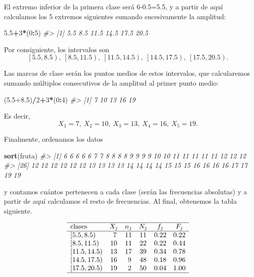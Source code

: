 \documentclass[
]{book}
\newenvironment{Shaded}{\begin{snugshade}}{\end{snugshade}}
\newcommand{\CommentTok}[1]{\textcolor[rgb]{0.56,0.35,0.01}{\textit{#1}}}
\newcommand{\DecValTok}[1]{\textcolor[rgb]{0.00,0.00,0.81}{#1}}
\newcommand{\FloatTok}[1]{\textcolor[rgb]{0.00,0.00,0.81}{#1}}
\newcommand{\KeywordTok}[1]{\textcolor[rgb]{0.13,0.29,0.53}{\textbf{#1}}}
\newcommand{\NormalTok}[1]{#1}
\newcommand{\OperatorTok}[1]{\textcolor[rgb]{0.81,0.36,0.00}{\textbf{#1}}}
\theoremstyle{definition}
\theoremstyle{definition}
\theoremstyle{definition}
\theoremstyle{remark}
\begin{document}
El extremo inferior de la primera clase será 6-0.5=5.5, y a partir de aquí calculamos los 5 extremos siguientes sumando sucesivamente la amplitud:

\begin{Shaded}
\begin{Highlighting}[]
\FloatTok{5.5}\OperatorTok{+}\DecValTok{3}\OperatorTok{*}\NormalTok{(}\DecValTok{0}\OperatorTok{:}\DecValTok{5}\NormalTok{)}
\CommentTok{\#\textgreater{} [1]  5.5  8.5 11.5 14.5 17.5 20.5}
\end{Highlighting}
\end{Shaded}

Por consiguiente, los intervalos son
\[
\left[5.5, 8.5\right),\ \left[8.5,11.5\right),\ \left[11.5, 14.5\right),\ \left[14.5, 17.5\right),\ \left[17.5, 20.5\right).
\]

Las marcas de clase serán los puntos medios de estos intervalos, que calcularemos sumando múltiplos consecutivos de la amplitud al primer punto medio:

\begin{Shaded}
\begin{Highlighting}[]
\NormalTok{(}\FloatTok{5.5+8.5}\NormalTok{)}\OperatorTok{/}\DecValTok{2}\OperatorTok{+}\DecValTok{3}\OperatorTok{*}\NormalTok{(}\DecValTok{0}\OperatorTok{:}\DecValTok{4}\NormalTok{)}
\CommentTok{\#\textgreater{} [1]  7 10 13 16 19}
\end{Highlighting}
\end{Shaded}

Es decir,
\[
X_1=7,\  X_2=10, \ X_3= 13,\  X_4= 16,\  X_5= 19.
\]

Finalmente, ordenamos los datos

\begin{Shaded}
\begin{Highlighting}[]
\KeywordTok{sort}\NormalTok{(fruta)}
\CommentTok{\#\textgreater{}  [1]  6  6  6  6  6  7  7  8  8  8  8  9  9  9  9 10 10 11 11 11 11 11 12 12 12}
\CommentTok{\#\textgreater{} [26] 12 12 12 12 12 12 13 13 13 13 14 14 14 14 15 15 15 16 16 16 16 17 17 19 19}
\end{Highlighting}
\end{Shaded}

y contamos cuántos pertenecen a cada clase (serán las frecuencias absolutas) y a partir de aquí calculamos el resto de frecuencias. Al final, obtenemos la tabla siguiente.

\[
\begin{array}{lccccc}
\hline
\text{clases}  & X_j & n_j & N_j &  f_j &  F_j \\ \hline 
\left[5.5,8.5\right)  & \ 7  & 11 & 11 & 0.22 &  0.22 \\ 
\left[8.5,11.5\right) & 10  & 11  & 22  & 0.22  & 0.44 \\
\left[11.5,14.5\right) & 13 & 17  & 39  & 0.34  & 0.78 \\ 
\left[14.5,17.5\right) & 16 & \ 9  & 48 & 0.18  & 0.96\\
\left[17.5,20.5\right) & 19   & \ 2  & 50 & 0.04  & 1.00 \\ \hline
\end{array}
\]
\end{document}
